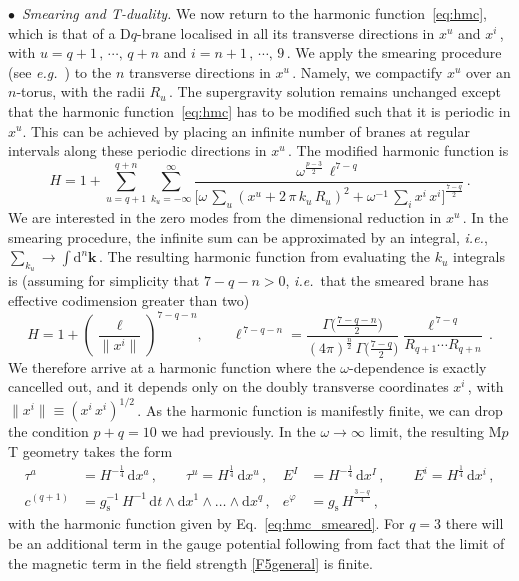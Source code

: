 \documentclass[11pt]{article}
\newcommand{\be}{\begin{equation}}
\newcommand{\ee}{\end{equation}}
\renewcommand{\emph}[1]{\textit{#1}}
\newcommand{\dd}{\mathrm{d}}
\begin{document}
\vspace{3mm}

\noindent $\bullet$~\emph{Smearing and T-duality.} We now return to the harmonic function~\eqref{eq:hmc}, 
%
which is that of a D$q$-brane localised in all its transverse directions in $x^u$ and $x^i$\,, with $u = q+1\,, \, \cdots, \, q+n$ and $i = n+1\,, \, \cdots, \, 9$\,.
We apply the smearing procedure (see \emph{e.g.}~\cite{Ortin:2015hya}) to the $n$ transverse directions in $x^u$\,. Namely, we compactify $x^u$ over an $n$-torus, with the radii $R_u$\,. The supergravity solution
remains unchanged except that the harmonic function~\eqref{eq:hmc} has to be modified such that it is periodic in $x^u$.
This can be achieved by placing an infinite number of branes at regular intervals along these periodic directions in $x^u$\,. The modified harmonic function is
%
\be \label{eq:hosm}
    H = 1 + \sum_{u = q + 1}^{q + n} \sum_{k_u = -\infty}^\infty \frac{\omega^{\frac{p-3}{2}} \, \ell^{7 - q}}{\bigl[ \omega \, \sum_u ( x^u + 2 \, \pi \, k_u \, R_u )^2 + \omega^{-1} \, \sum_i x^i \, x^i \bigr]^{\frac{7 - q}{2}}}\,.
\ee
%
We are interested in the zero modes from the dimensional reduction in $x^u$\,. In the smearing procedure, the infinite sum can be approximated by an integral, \emph{i.e.},
%
$\sum_{k_u} \rightarrow \int \dd^n \mathbf{k}$\,.
%
The resulting harmonic function from evaluating the $k_u$ integrals is (assuming for simplicity that $7-q-n>0$, \emph{i.e.}~that the smeared brane has effective codimension greater than two)
\newcommand{\ellsmear}{\boldsymbol{\ell}}
%
\be \label{eq:hmc_smeared}
    H = 1 + \left( \frac{\ellsmear}{\| x^i \|} \right)^{\!\!7-q-n}\!\!,
        \qquad%
    \ellsmear^{\,7-q-n} = \frac{\Gamma\bigl(\frac{7-q-n}{2}\bigr)}{(4\pi)^{\frac{n}{2}} \, \Gamma\bigl(\frac{7-q}{2}\bigr)} \frac{\ell^{\,7-q}}{R_{q+1} \cdots R_{q+n}}\,.
\ee
We therefore arrive at a harmonic function where the $\omega$-dependence is exactly cancelled out, and it depends only on the doubly transverse coordinates $x^i$\,, with $\|x^i\| \equiv( x^i \, x^i)^{1/2}$\,.
As the harmonic function is manifestly finite, we can drop the condition $p+q=10$ we had previously.
In the $\omega \rightarrow \infty$ limit, the resulting M$p$T geometry takes the form
%
\begin{subequations} \label{DqSoln_forlimit_mixed_smeared}
\begin{align}
    \tau^a & = H^{-\frac{1}{4}} \, \dd x^a \,,
        \qquad%
    \tau^u = H^{\frac{1}{4}} \, \dd x^u\,,
        &%
    E^I & = H^{-\frac{1}{4}} \, \dd x^I \,,
        \qquad%
    E^i = H^{\frac{1}{4}} \, \dd x^i\,, \\[4pt]
    c^{(q+1)} & = g_\text{s}^{-1} \, H^{-1} \, \dd t \wedge \dd x^1 \wedge \dots \wedge \dd x^{q} \,,
        &%
    e^{\varphi} &= g^{}_\text{s} \, H^{\frac{3-q}{4}}\,,
\end{align}
\end{subequations}
%
with the harmonic function given by Eq.~\eqref{eq:hmc_smeared}.
For $q=3$ there will be an additional term in the gauge potential following from fact that the limit of the magnetic term in the field strength \eqref{F5general} is finite. 
%
\end{document}
